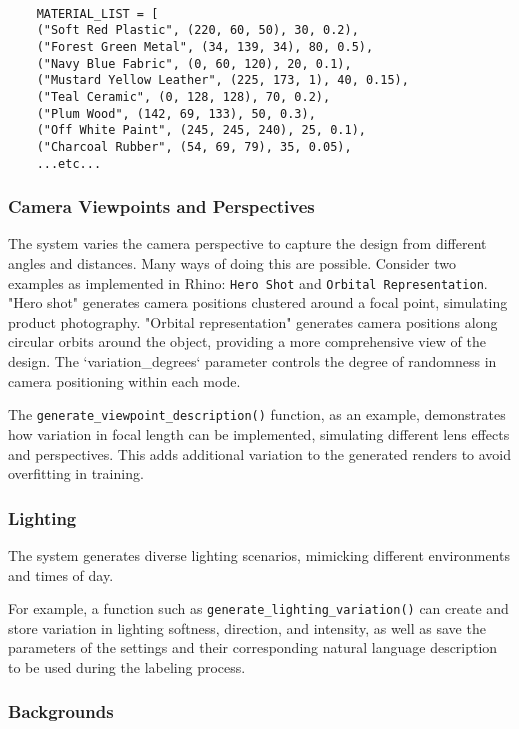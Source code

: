 \documentclass{article}
\begin{document}
        \begin{verbatim}
        
    MATERIAL_LIST = [
    ("Soft Red Plastic", (220, 60, 50), 30, 0.2),
    ("Forest Green Metal", (34, 139, 34), 80, 0.5),
    ("Navy Blue Fabric", (0, 60, 120), 20, 0.1),
    ("Mustard Yellow Leather", (225, 173, 1), 40, 0.15),
    ("Teal Ceramic", (0, 128, 128), 70, 0.2),
    ("Plum Wood", (142, 69, 133), 50, 0.3),
    ("Off White Paint", (245, 245, 240), 25, 0.1),
    ("Charcoal Rubber", (54, 69, 79), 35, 0.05),
    ...etc...
        \end{verbatim}

\subsubsection{Camera Viewpoints and Perspectives}

The system varies the camera perspective to capture the design from different angles and distances. Many ways of doing this are possible. Consider two examples as implemented in Rhino: \texttt{Hero Shot} and \texttt{Orbital Representation}. "Hero shot" generates camera positions clustered around a focal point, simulating product photography. "Orbital representation" generates camera positions along circular orbits around the object, providing a more comprehensive view of the design. The `variation\_degrees` parameter controls the degree of randomness in camera positioning within each mode.

The \texttt{generate\_viewpoint\_description()} function, as an example, demonstrates how variation in focal length can be implemented, simulating different lens effects and perspectives. This adds additional variation to the generated renders to avoid overfitting in training.


\subsubsection{Lighting} 

The system generates diverse lighting scenarios, mimicking different environments and times of day.

For example, a function such as \texttt{generate\_lighting\_variation()} can create and store variation in lighting softness, direction, and intensity, as well as save the parameters of the settings and their corresponding natural language description to be used during the labeling process. 


\subsubsection{Backgrounds}
\end{document}
